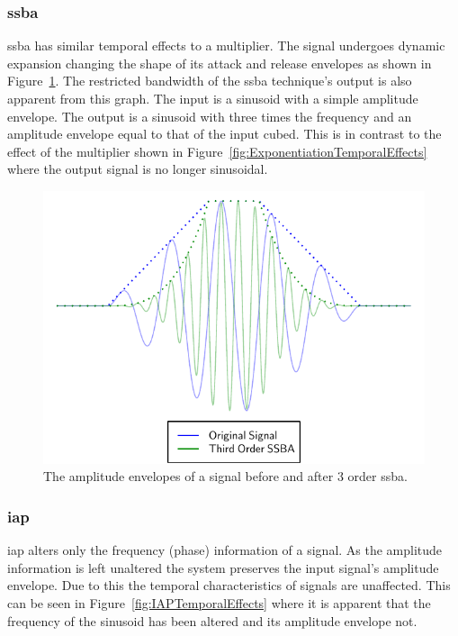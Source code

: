 		\subsubsection*{\acrshort{ssba}}
			\acrshort{ssba} has similar temporal effects to a multiplier. The signal undergoes dynamic
			expansion changing the shape of its attack and release envelopes as shown in
			Figure~\ref{fig:SSBATemporalEffects}.  The restricted bandwidth of the \acrshort{ssba} technique's
			output is also apparent from this graph. The input is a sinusoid with a simple amplitude envelope.
			The output is a sinusoid with three times the frequency and an amplitude envelope equal to that of
			the input cubed. This is in contrast to the effect of the multiplier shown in
			Figure~\ref{fig:ExponentiationTemporalEffects} where the output signal is no longer sinusoidal.

			\begin{figure}[h!]
				\centering
				\includegraphics{chapter5/Images/SSBATemporalEffects.pdf}
				\caption{The amplitude envelopes of a signal before and after 3 order
					 \acrshort{ssba}.}
				\label{fig:SSBATemporalEffects}
			\end{figure}

		\subsubsection*{\acrshort{iap}}
			\acrshort{iap} alters only the frequency (phase) information of a signal. As the amplitude
			information is left unaltered the system preserves the input signal's amplitude envelope. Due to
			this the temporal characteristics of signals are unaffected. This can be seen in
			Figure~\ref{fig:IAPTemporalEffects} where it is apparent that the frequency of the sinusoid has
			been altered and its amplitude envelope not.


